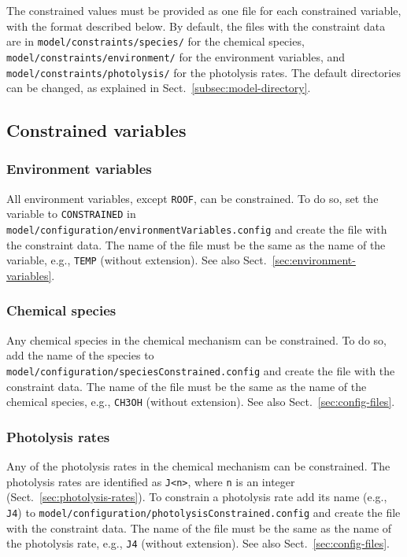 The constrained values must be provided as one file for each
constrained variable, with the format described below. By default, the
files with the constraint data are in \texttt{model/constraints/species/}
for the chemical species, \texttt{model/constraints/environment/} for
the environment variables, and \texttt{model/constraints/photolysis/}
for the photolysis rates. The default directories can be changed, as
explained in Sect.~\ref{subsec:model-directory}.

\subsection{Constrained variables} \label{subsec:constrained-variables}

\subsubsection{Environment variables}

All environment variables, except \texttt{ROOF}, can be
constrained. To do so, set the variable to \texttt{CONSTRAINED} in
\texttt{model/configuration/environmentVariables.config} and create
the file with the constraint data. The name of the file must be the
same as the name of the variable, e.g., \texttt{TEMP} (without
extension). See also Sect.~\ref{sec:environment-variables}.

\subsubsection{Chemical species}

Any chemical species in the chemical mechanism can be constrained. To
do so, add the name of the species to
\texttt{model/configuration/speciesConstrained.config} and create the
file with the constraint data. The name of the file must be the same
as the name of the chemical species, e.g., \texttt{CH3OH} (without
extension). See also Sect.~\ref{sec:config-files}.

\subsubsection{Photolysis rates}

Any of the photolysis rates in the chemical mechanism can be
constrained. The photolysis rates are identified as \verb|J<n>|, where
\texttt{n} is an integer (Sect.~\ref{sec:photolysis-rates}). To
constrain a photolysis rate add its name (e.g., \texttt{J4}) to
\texttt{model/configuration/photolysisConstrained.config} and create
the file with the constraint data. The name of the file must be the
same as the name of the photolysis rate, e.g., \texttt{J4} (without
extension). See also Sect.~\ref{sec:config-files}.

